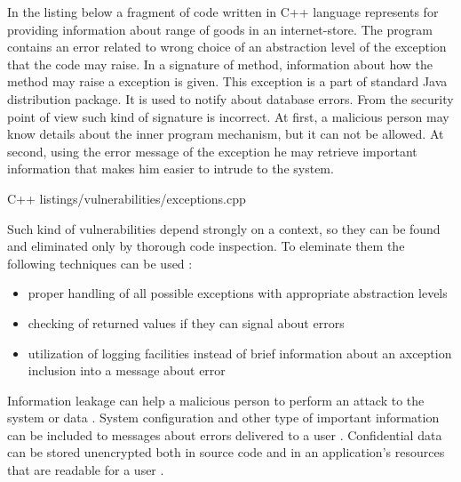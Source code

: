 %
In the listing below a fragment of code written in C++ language represents  for providing information about range of goods in an internet-store. 
%
The program contains an error related to wrong choice of an abstraction level of the exception that the code may raise. 
%
In a signature of  method, information about how the method may raise a  exception is given. 
%
This exception is a part of standard Java distribution package. 
%
It is used to notify about database errors. 
%
From the security point of view such kind of signature is incorrect. 
%
At first, a malicious person may know details about the inner program mechanism, but it can not be allowed. 
%
At second, using the error message of the exception he may retrieve important information that makes him easier to intrude to the system. 

	{C++}
	{listings/vulnerabilities/exceptions.cpp}

%
Such kind of vulnerabilities depend strongly on a context, so they can be found and eliminated only by thorough code inspection. 
%
To eleminate them the following techniques can be used :
\begin{itemize}
	\item proper handling of all possible exceptions with appropriate abstraction levels
	\item checking of returned values if they can signal about errors
	\item utilization of logging facilities instead of brief information about an axception inclusion into a message about error
\end{itemize}



%
Information leakage can help a malicious person to perform an attack to the system or data . 
%
System configuration and other type of important information can be included to messages about errors delivered to a user . 
%
Confidential data can be stored unencrypted both in source code and in an application's resources that are readable for a user .

